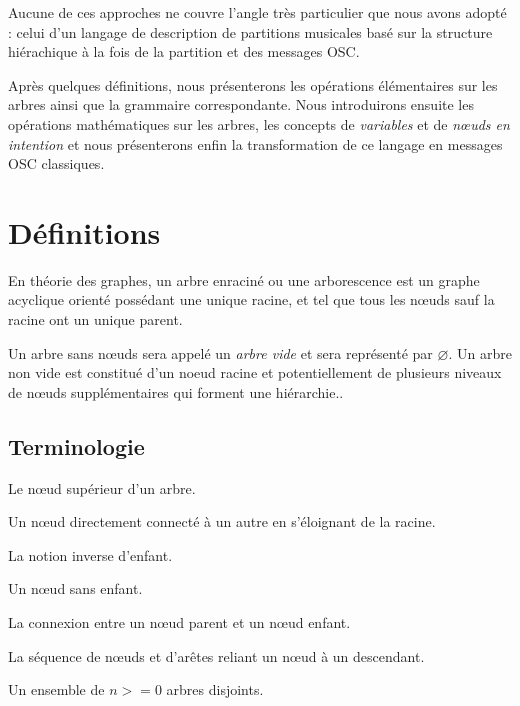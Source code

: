 \documentclass{article}
\newcommand{\nulltree}	{\ensuremath{\varnothing}}
\begin{document}
Aucune de ces approches ne couvre l'angle très particulier que nous avons adopté : celui d'un langage de description de partitions musicales basé sur la structure hiérachique à la fois de la partition et des messages OSC.

Après quelques définitions, nous présenterons les opérations élémentaires sur les arbres ainsi que la grammaire correspondante. Nous introduirons ensuite les opérations mathématiques sur les arbres, les concepts de \emph{variables} et de \emph{nœuds en intention} et nous présenterons enfin la transformation de ce langage en messages OSC classiques.



\section{Définitions}

En théorie des graphes, un arbre enraciné ou une arborescence est un graphe acyclique orienté possédant une unique racine, et tel que tous les nœuds sauf la racine ont un unique parent. 

Un arbre sans nœuds sera appelé un \emph{arbre vide} et sera représenté par \nulltree. Un arbre non vide est constitué d'un noeud racine et potentiellement de plusieurs niveaux de nœuds supplémentaires qui forment une hiérarchie..


\subsection{Terminologie}

\begin{description}
 \setlength\itemsep{0.0em}
\item[Racine]	Le nœud supérieur d'un arbre.
\item[Enfant]	Un nœud directement connecté à un autre en s'éloignant de la racine.
\item[Parent]	La notion inverse d’enfant.
\item[Feuille]	Un nœud sans enfant.
\item[Arête]	La connexion entre un nœud parent et un nœud enfant.
\item[Chemin]	La séquence de nœuds et d’arêtes reliant un nœud à un descendant.
\item[Forêt]	Un ensemble de $n >= 0$ arbres disjoints.
\end{description}
\end{document}
